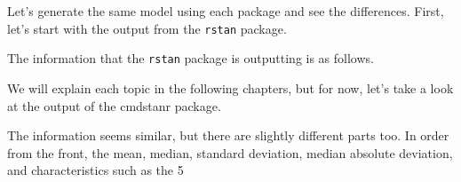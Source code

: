 \documentclass{ltjsbook}
\begin{document}
Let's generate the same model using each package and see the differences. First, let's start with the output from the \verb|rstan| package.



The information that the \verb|rstan| package is outputting is as follows.

We will explain each topic in the following chapters, but for now, let's take a look at the output of the cmdstanr package.


The information seems similar, but there are slightly different parts too. In order from the front, the mean, median, standard deviation, median absolute deviation, and characteristics such as the 5%
\end{document}
